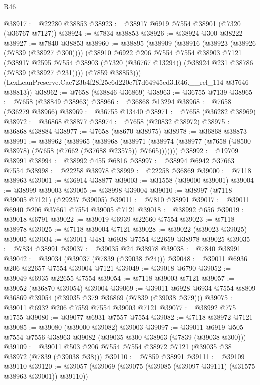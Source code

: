 \begin{lexlean}{R46}
\begin{coremodule}
@38917 := @22280 @38853
@38923 := @38917 @6919 @7554 @38901 (@7320 (@36767 @7127))
@38924 := @7834 @38853
@38926 := @38924 @300 @38222
@38927 := @7840 @38853
@38960 := @38895
    (@38909
      (@38916
        (@38923 (@38926 (@7839 (@38927 @300))))
        (@38910
          @6922
          @206
          @7554
          @7554
          @38903
          @7121
          (@38917
            @2595
            @7554
            @38903
            (@7320 (@36767 @13294))
            (@38924 @231 @38786 (@7839 (@38927 @231))))
          (@7859 @38853)))
      (LexLeanPreserve.Cae723b4f28f25c6d220e7f7d64945ed3.R46.__rel_114 @37646 @38813))
@38962 := @7658 (@38846 @36869)
@38963 := @36755 @7139
@38965 := @7658 (@38849 @38963)
@38966 := @36868 @13294
@38968 := @7658 (@36279 @38966)
@38969 := @36755 @13440
@38971 := @7658 (@36282 @38969)
@38972 := @36868 @38877
@38974 := @7658 (@20832 @38972)
@38975 := @36868 @38884
@38977 := @7658 (@8670 @38975)
@38978 := @36868 @38873
@38991 := @38962
    (@38965
      (@38968
        (@38971 (@38974 (@38977 (@7658 (@8500 @38978) (@7658 (@7662 (@37688 @23575)) @7665)))))))
@38992 := @19709 @38991
@38994 := @38992 @455 @6816
@38997 := @38994 @6942 @37663 @7554
@38998 := @22258 @38978
@38999 := @22258 @36869
@39000 := @7118 @38963
@39001 := @36914 @38877
@39003 := @31558 (@39000 @39001)
@39004 := @38999 @39003
@39005 := @38998 @39004
@39010 := @38997 (@7118 @39005 @7121) (@29237 @39005)
@39011 := @7810 @38991
@39017 := @39011 @6940 @206 @37661 @7554 @39005 @7121
@39018 := @38992 @656
@39019 := @39018 @6791
@39022 := @39019 @6939 @22660 @7554
@39023 := @7118 @38978
@39025 := @7118 @39004 @7121
@39028 := @39022 (@39023 @39025) @39005
@39034 := @39011 @481 @6938 @7554 @22659 @38978 @39025
@39035 := @7834 @38991
@39037 := @39035 @24 @38978
@39038 := @7840 @38991
@39042 := @39034 (@39037 (@7839 (@39038 @24)))
@39048 := @39011 @6936 @206 @22657 @7554 @39004 @7121
@39049 := @39018 @6790
@39052 := @39049 @6935 @22655 @7554
@39054 := @7118 @39003 @7121
@39057 := @39052 (@36870 @39054) @39004
@39069 := @39011 @6928 @6934 @7554 @8809 @36869 @39054 (@39035 @379 @36869 (@7839 (@39038 @379)))
@39075 := @39011 @6932 @206 @7559 @7554 @39003 @7121
@39077 := @38992 @775 @1755
@39080 := @39077 @6931 @7557 @7554
@39082 := @7118 @38972 @7121
@39085 := @39080 (@39000 @39082) @39003
@39097 := @39011 @6919 @505 @7554 @7556 @38963 @39082 (@39035 @300 @38963 (@7839 (@39038 @300)))
@39109 := @39011 @503 @206 @7554 @7554 @38972 @7121 (@39035 @38 @38972 (@7839 (@39038 @38)))
@39110 := @7859 @38991
@39111 := @39109 @39110
@39120 := @39057 (@39069 (@39075 (@39085 (@39097 @39111) (@31575 @38963 @39001)) @39110))

\end{coremodule}
\end{lexlean}
